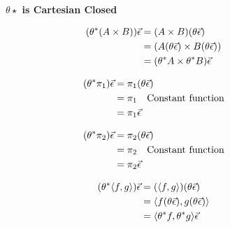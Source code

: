 \documentclass{report}
\begin{document}
\begin{figure}
    \centering
        \begin{framed}
            \centering\textbf{$\theta\star$ is Cartesian Closed}

            \begin{minipage}{.45\linewidth}
                \begin{align*}
                    (\theta^*(A\times B))\vec{\epsilon} & = (A\times B)(\theta\vec{\epsilon})\\
                    & = (A(\theta \vec{\epsilon})\times B(\theta\vec{\epsilon}))\\
                    & = (\theta^* A\times \theta^* B)\vec{\epsilon}\\
                \end{align*}              
            \end{minipage}
            \quad
            \begin{minipage}{.45\linewidth}
                \begin{align*}
                    (\theta^* \pi_1)\vec{\epsilon} & = \pi_1(\theta\vec{\epsilon})\\
                    & = \pi_1 \quad\text{Constant function}\\
                    & = \pi_1\vec{\epsilon}
                \end{align*}                
            \end{minipage}


            \begin{minipage}{.45\linewidth}
                \begin{align*}
                    (\theta^* \pi_2)\vec{\epsilon} & = \pi_2(\theta\vec{\epsilon})\\
                    & = \pi_2 \quad\text{Constant function}\\
                    & = \pi_2\vec{\epsilon}
                \end{align*}                
            \end{minipage}
            \quad
            \begin{minipage}{.45\linewidth}
                \begin{align*}
                    (\theta^*\langle f, g\rangle)\vec{\epsilon} & = (\langle f, g\rangle)(\theta\vec{\epsilon})\\
                    & = \langle f(\theta\vec{\epsilon}), g(\theta\vec{\epsilon})\rangle\\
                    &= \langle\theta^* f, \theta^* g\rangle\vec{\epsilon}
                \end{align*}
            \end{minipage}


\end{framed}
\end{figure}
\end{document}
